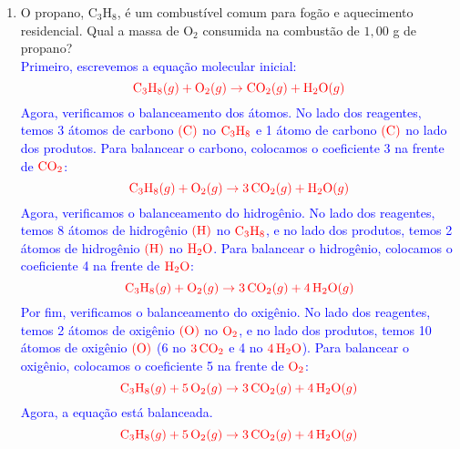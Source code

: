 \documentclass[a4paper, 12pt]{article}
\begin{document}
\begin{enumerate}
    \item O propano, $\text{C}_{3}\text{H}_{8}$, é um combustível comum para fogão
          e aquecimento residencial. Qual a massa de $\text{O}_{2}$ consumida na
          combustão de $1,00$ g de propano?
          \\[10pt]
          \textcolor{blue}{Primeiro, escrevemos a equação molecular inicial:}
          \[
              \textcolor{red}{\text{C}_3\text{H}_8 (g) + \text{O}_2 (g) \rightarrow \text{CO}_2 (g) + \text{H}_2\text{O} (g)}
          \]
          \textcolor{blue}{Agora, verificamos o balanceamento dos átomos. No lado dos reagentes, temos 3 átomos de carbono \(\textcolor{red}{(\text{C})}\) no \(\textcolor{red}{\text{C}_3\text{H}_8}\) e 1 átomo de carbono \(\textcolor{red}{(\text{C})}\) no lado dos produtos. Para balancear o carbono, colocamos o coeficiente 3 na frente de \(\textcolor{red}{\text{CO}_2}\):}
          \[
              \textcolor{red}{\text{C}_3\text{H}_8 (g) + \text{O}_2 (g) \rightarrow 3 \, \text{CO}_2 (g) + \text{H}_2\text{O} (g)}
          \]
          \textcolor{blue}{Agora, verificamos o balanceamento do hidrogênio. No lado dos reagentes, temos 8 átomos de hidrogênio \(\textcolor{red}{(\text{H})}\) no \(\textcolor{red}{\text{C}_3\text{H}_8}\), e no lado dos produtos, temos 2 átomos de hidrogênio \(\textcolor{red}{(\text{H})}\) no \(\textcolor{red}{\text{H}_2\text{O}}\). Para balancear o hidrogênio, colocamos o coeficiente 4 na frente de \(\textcolor{red}{\text{H}_2\text{O}}\):}
          \[
              \textcolor{red}{\text{C}_3\text{H}_8 (g) + \text{O}_2 (g) \rightarrow 3 \, \text{CO}_2 (g) + 4 \, \text{H}_2\text{O} (g)}
          \]
          \textcolor{blue}{Por fim, verificamos o balanceamento do oxigênio. No lado dos reagentes, temos 2 átomos de oxigênio \(\textcolor{red}{(\text{O})}\) no \(\textcolor{red}{\text{O}_2}\), e no lado dos produtos, temos 10 átomos de oxigênio \(\textcolor{red}{(\text{O})}\) (6 no \(\textcolor{red}{3 \, \text{CO}_2}\) e 4 no \(\textcolor{red}{4 \, \text{H}_2\text{O}}\)). Para balancear o oxigênio, colocamos o coeficiente 5 na frente de \(\textcolor{red}{\text{O}_2}\):}
          \[
              \textcolor{red}{\text{C}_3\text{H}_8 (g) + 5 \, \text{O}_2 (g) \rightarrow 3 \, \text{CO}_2 (g) + 4 \, \text{H}_2\text{O} (g)}
          \]
          \textcolor{blue}{Agora, a equação está balanceada.}
          \[
              \textcolor{red}{\text{C}_3\text{H}_8 (g) + 5 \, \text{O}_2 (g) \rightarrow 3 \, \text{CO}_2 (g) + 4 \, \text{H}_2\text{O} (g)}
          \]
          \textcolor{blue}{}

\end{enumerate}
\end{document}
